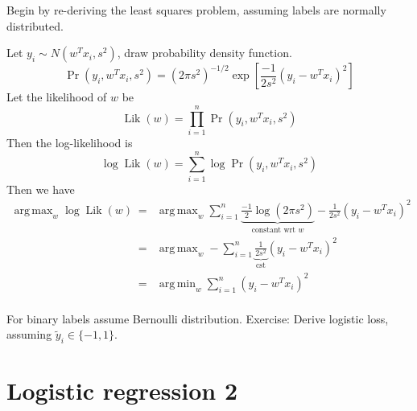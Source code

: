 \documentclass{article}
\DeclareMathOperator*{\argmin}{arg\,min}
\DeclareMathOperator*{\argmax}{arg\,max}
\DeclareMathOperator*{\Lik}{Lik}
\begin{document}
Begin by re-deriving the least squares problem, assuming labels are
normally distributed.

Let $y_i\sim N(w^T x_i, s^2)$, draw probability density function.
\begin{equation*}
  \Pr(y_i, w^T x_i, s^2) = (2\pi s^2)^{-1/2} \exp\left[
\frac{-1}{2s^2}(y_i-w^Tx_i)^2
\right]
\end{equation*}
Let the likelihood of $w$ be
\begin{equation*}
  \Lik(w) = \prod_{i=1}^n \Pr(y_i, w^T x_i, s^2)
\end{equation*}
Then the log-likelihood is
\begin{equation*}
  \log\Lik(w) = \sum_{i=1}^n \log\Pr(y_i, w^T x_i, s^2)
\end{equation*}
Then we have 
\begin{eqnarray*}
  \argmax_w \log\Lik(w) 
&=& \argmax_w \sum_{i=1}^n \underbrace{
\frac{-1}{2}\log(2\pi s^2)
}_{\text{constant wrt $w$}} -
\frac{1}{2s^2}(y_i-w^Tx_i)^2\\
&=& \argmax_w -\sum_{i=1}^n
\underbrace{
\frac{1}{2s^2}
}_{\text{cst}}(y_i-w^Tx_i)^2\\
&=& \argmin_w \sum_{i=1}^n
(y_i-w^Tx_i)^2\\
\end{eqnarray*}

For binary labels assume Bernoulli distribution. Exercise: Derive
logistic loss, assuming $\tilde y_i\in\{-1,1\}$.

\section{Logistic regression 2}
\end{document}
